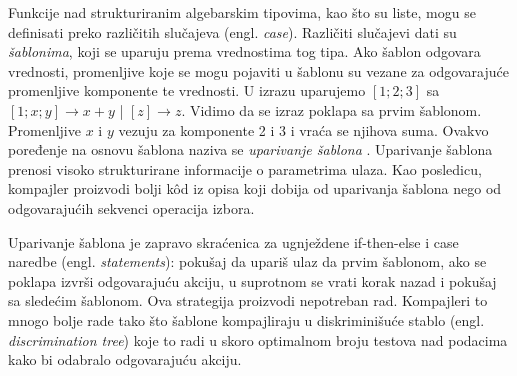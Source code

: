 
Funkcije nad strukturiranim algebarskim tipovima, kao što su liste, mogu se definisati preko različitih slučajeva (engl. \textit{case}). Različiti slučajevi dati su \textit{šablonima}, koji se uparuju prema vrednostima tog tipa. Ako šablon odgovara vrednosti, promenljive koje se mogu pojaviti u šablonu su vezane za odgovarajuće promenljive komponente te vrednosti. U izrazu uparujemo $[1; 2; 3]$  sa $[1; x; y] \longrightarrow x+y$ |  $[z] \longrightarrow z$. Vidimo da se izraz poklapa sa prvim šablonom. Promenljive $x$ i $y$ vezuju za komponente 2 i 3 i vraća se njihova suma. Ovakvo poređenje na osnovu šablona naziva se \textit{uparivanje šablona} \cite{compiler-design, compiling-fl}. Uparivanje šablona prenosi visoko strukturirane informacije o parametrima ulaza. Kao posledicu, kompajler proizvodi bolji k\^ od iz opisa koji dobija od uparivanja šablona nego od odgovarajućih sekvenci operacija izbora. %

Uparivanje šablona je zapravo skraćenica za ugnježdene if-then-else i case naredbe (engl. \textit{statements}): pokušaj da upariš ulaz da prvim šablonom, ako se poklapa izvrši odgovarajuću akciju, u suprotnom se vrati korak nazad i pokušaj sa sledećim šablonom. Ova strategija proizvodi nepotreban rad. Kompajleri to mnogo bolje rade tako što šablone kompajliraju u diskriminišuće stablo (engl. \textit{discrimination tree}) koje to radi u skoro optimalnom broju testova nad podacima kako bi odabralo odgovarajuću akciju. 
